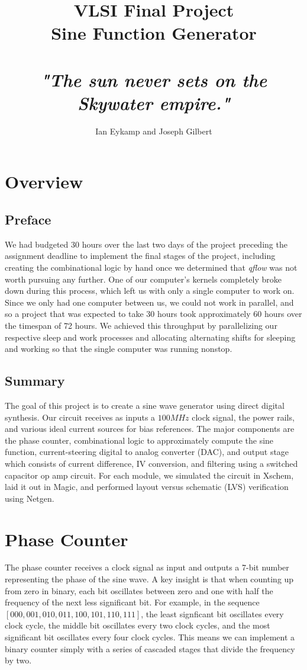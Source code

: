 \documentclass{article}
\title{VLSI Final Project\\
\vspace{10pt}
\large Sine Function Generator\\ \\
\textit{"The sun never sets on the Skywater empire."}}
\author{Ian Eykamp and Joseph Gilbert}
\begin{document}
\maketitle

\section{Overview}
\subsection{Preface}
We had budgeted 30 hours over the last two days of the project preceding the assignment deadline to implement the final stages of the project, including creating the combinational logic by hand once we determined that \emph{qflow} was not worth pursuing any further. One of our computer's kernels completely broke down during this process, which left us with only a single computer to work on. Since we only had one computer between us, we could not work in parallel, and so a project that was expected to take 30 hours took approximately 60 hours over the timespan of 72 hours. We achieved this throughput by parallelizing our respective sleep and work processes and allocating alternating shifts for sleeping and working so that the single computer was running nonstop. 

\subsection{Summary}
The goal of this project is to create a sine wave generator using direct digital synthesis. Our circuit receives as inputs a $100MHz$ clock signal, the power rails, and various ideal current sources for bias references. The major components are the phase counter, combinational logic to approximately compute the sine function, current-steering digital to analog converter (DAC), and output stage which consists of current difference, IV conversion, and filtering using a switched capacitor op amp circuit. For each module, we simulated the circuit in Xschem, laid it out in Magic, and performed layout versus schematic (LVS) verification using Netgen.

\section{Phase Counter}

The phase counter receives a clock signal as input and outputs a 7-bit number representing the phase of the sine wave. A key insight is that when counting up from zero in binary, each bit oscillates between zero and one with half the frequency of the next less significant bit. For example, in the sequence $[000, 001, 010, 011, 100, 101, 110, 111]$, the least signficant bit oscillates every clock cycle, the middle bit oscillates every two clock cycles, and the most significant bit oscillates every four clock cycles. This means we can implement a binary counter simply with a series of cascaded stages that divide the frequency by two.\\
\end{document}
